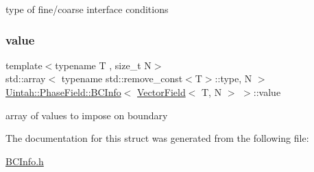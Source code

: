 type of fine/coarse interface conditions 

\mbox{\label{structUintah_1_1PhaseField_1_1BCInfo_3_01VectorField_3_01T_00_01N_01_4_01_4_a7c5590e798cd64c8fadaa2dbbfdbc6c0}} 
\subsubsection{\texorpdfstring{value}{value}}
{\footnotesize\ttfamily template$<$typename T , size\+\_\+t N$>$ \\
std\+::array$<$ typename std\+::remove\+\_\+const$<$T$>$\+::type, N $>$ \hyperlink{structUintah_1_1PhaseField_1_1BCInfo}{Uintah\+::\+Phase\+Field\+::\+B\+C\+Info}$<$ \hyperlink{structUintah_1_1PhaseField_1_1VectorField}{Vector\+Field}$<$ T, N $>$ $>$\+::value}



array of values to impose on boundary 



The documentation for this struct was generated from the following file\+:\begin{DoxyCompactItemize}
\item 
\hyperlink{BCInfo_8h}{B\+C\+Info.\+h}\end{DoxyCompactItemize}
